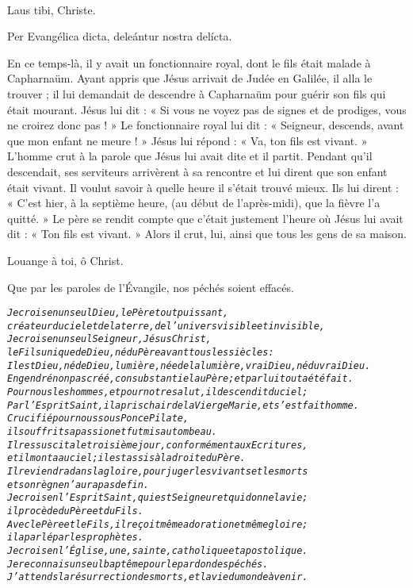 \documentclass[twoside]{article}
\begin{document}
\begin{paracol}{2}
\\
\rr Laus tibi, Christe.

 Per Evangélica dicta, deleántur nostra delícta.

\switchcolumn

En ce temps-là, il y avait un fonctionnaire royal, dont le fils était malade à Capharnaüm.
Ayant appris que Jésus arrivait de Judée en Galilée, il alla le trouver ; il lui demandait de descendre à Capharnaüm pour guérir son fils qui était mourant.
Jésus lui dit : « Si vous ne voyez pas de signes et de prodiges, vous ne croirez donc pas ! »
Le fonctionnaire royal lui dit : « Seigneur, descends, avant que mon enfant ne meure ! »
Jésus lui répond : « Va, ton fils est vivant. » L’homme crut à la parole que Jésus lui avait dite et il partit.
Pendant qu’il descendait, ses serviteurs arrivèrent à sa rencontre et lui dirent que son enfant était vivant.
Il voulut savoir à quelle heure il s’était trouvé mieux. Ils lui dirent : « C’est hier, à la septième heure, (au début de l’après-midi), que la fièvre l’a quitté. »
Le père se rendit compte que c’était justement l’heure où Jésus lui avait dit : « Ton fils est vivant. » Alors il crut, lui, ainsi que tous les gens de sa maison.

\rr Louange à toi, ô Christ.

Que par les paroles de l’Évangile, nos péchés soient effacés.

\end{paracol}

\begin{alltt}\normalfont
\emph{Je crois en un seul Dieu, le Père tout puissant,
	créateur du ciel et de la terre, de l’univers visible et invisible,
Je crois en un seul Seigneur, Jésus Christ,
	le Fils unique de Dieu, né du Père avant tous les siècles :
Il est Dieu, né de Dieu, lumière, née de la lumière, vrai Dieu, né du vrai Dieu.
Engendré non pas créé, consubstantiel au Père ; et par lui tout a été fait.
Pour nous les hommes, et pour notre salut, il descendit du ciel;
Par l’Esprit Saint, il a pris chair de la Vierge Marie, et s’est fait homme.
Crucifié pour nous sous Ponce Pilate, 
	il souffrit sa passion et fut mis au tombeau.
Il ressuscita le troisième jour, conformément aux Ecritures,
	et il monta au ciel; il est assis à la droite du Père.
Il reviendra dans la gloire, pour juger les vivants et les morts
	et son règne n’aura pas de fin.
Je crois en l’Esprit Saint, qui est Seigneur et qui donne la vie;
	il procède du Père et du Fils.
Avec le Père et le Fils, il reçoit même adoration et même gloire;
	il a parlé par les prophètes.
Je crois en l’Église, une, sainte, catholique et apostolique.
Je reconnais un seul baptême pour le pardon des péchés.
J’attends la résurrection des morts, et la vie du monde à venir.}
\end{alltt}
\end{document}
